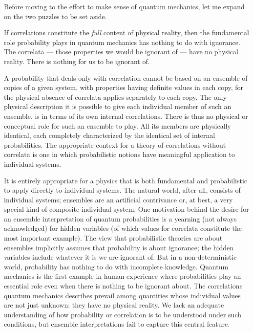 Before moving to the effort to make sense of quantum mechanics, let me
expand on the two puzzles to be set aside.

\bigskip{}\nobreak\medskip\nobreak If correlations constitute the {\it
full\/} content of physical reality, then the fundamental role
probability plays in quantum mechanics has nothing to do with
ignorance.  The correlata --- those properties we would be ignorant of
--- have no physical reality.  There is nothing for us to be ignorant
of.  

A probability that deals only with correlation cannot be based on an
ensemble of copies of a given system, with properties having definite
values in each copy, for the physical absence of correlata applies
separately to each copy.  The only physical description it is possible
to give each individual member of such an ensemble, is in terms of its
own internal correlations.  There is thus no physical or
conceptual role for such an ensemble to play.  All its members are
physically identical, each completely characterized by the identical
set of internal probabilities.  The appropriate context for a theory
of correlations without correlata is one in which probabilistic
notions have meaningful application to individual systems.

It is entirely appropriate for a physics that is both fundamental and
probabilistic to apply directly to individual systems.  The natural
world, after all, consists of individual systems; ensembles are an
artificial contrivance or, at best, a very special kind of composite
individual system.  One motivation behind the desire for an ensemble
interpretation of quantum probabilities is a yearning (not always
acknowledged) for hidden variables (of which values for correlata
constitute the most important example).  The view that probabilistic
theories are about ensembles implicitly assumes that probability is
about ignorance; the hidden variables include whatever it is we are
ignorant of.  But in a non-deterministic world, probability has
nothing to do with incomplete knowledge.  Quantum mechanics is the
first example in human experience where probabilities play an
essential role even when there is nothing to be ignorant
about.  The correlations quantum mechanics describes prevail among
quantities whose individual values are not just unknown: they have no
physical reality.  We lack an adequate understanding of how
probability or correlation is to be understood under such conditions,
but ensemble interpretations fail to capture this central
feature.

